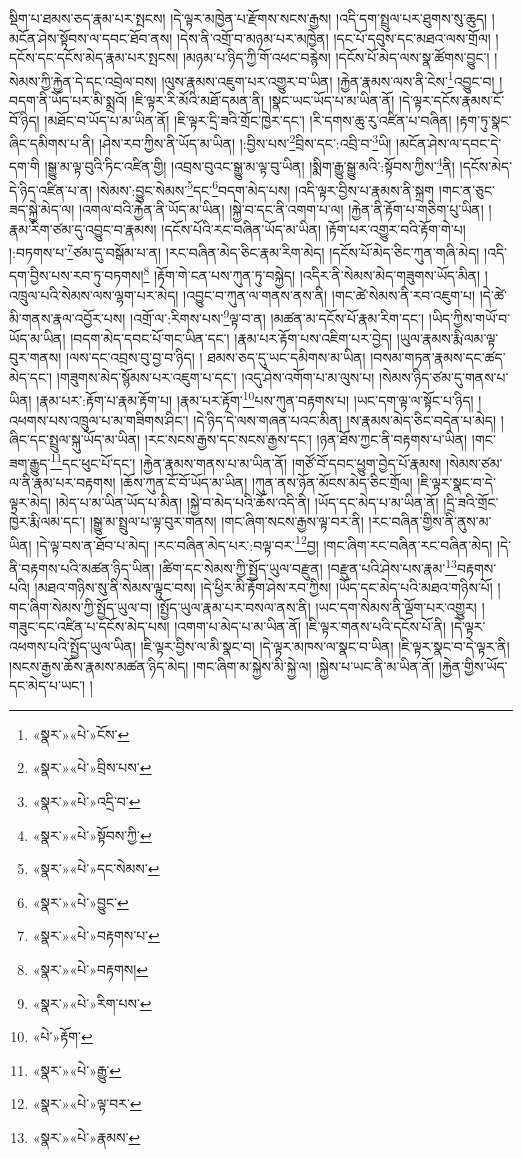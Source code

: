 སྡིག་པ་ཐམས་ཅད་རྣམ་པར་སྤངས། །དེ་ལྟར་མཁྱེན་པ་རྫོགས་སངས་རྒྱས། །འདི་དག་སྤྲུལ་པར་ཐུགས་སུ་ཆུད། །མངོན་ཤེས་སྟོབས་ལ་དབང་ཐོབ་ནས། །དེས་ནི་འགྲོ་བ་མཉམ་པར་མཁྱེན། །དང་པོ་དབུས་དང་མཐའ་ལས་གྲོལ། །དངོས་དང་དངོས་མེད་རྣམ་པར་སྤངས། །མཉམ་པ་ཉིད་ཀྱི་གོ་འཕང་བརྙེས། །དངོས་པོ་མེད་ལས་སྣ་ཚོགས་བྱུང་། །སེམས་ཀྱི་རྐྱེན་དེ་དང་འབྲེལ་བས། །ལུས་རྣམས་འཇུག་པར་འགྱུར་བ་ཡིན། །རྐྱེན་རྣམས་ལས་ནི་ངེས་\footnote{«སྣར་»«པེ་»ངོས་}འབྱུང་བ། །བདག་ནི་ཡོད་པར་མི་སྨྲའོ། །ཇི་ལྟར་རི་མོའི་མཐོ་དམན་ནི། །སྣང་ཡང་ཡོད་པ་མ་ཡིན་ནོ། །དེ་ལྟར་དངོས་རྣམས་ངོ་བོ་ཉིད། །མཐོང་བ་ཡོད་པ་མ་ཡིན་ནོ། །ཇི་ལྟར་དྲི་ཟའི་གྲོང་ཁྱེར་དང་། །རི་དགས་ཆུ་རུ་འཛིན་པ་བཞིན། །རྟག་ཏུ་སྣང་ཞིང་དམིགས་པ་ནི། །ཤེས་རབ་ཀྱིས་ནི་ཡོད་མ་ཡིན། །:བྱིས་པས་\footnote{«སྣར་»«པེ་»བྲིས་པས་}བྲིས་དང་:འབྲི་བ་\footnote{«སྣར་»«པེ་»འདྲི་བ་}ཡི། །མངོན་ཤེས་ལ་དབང་དེ་དག་གི །སྒྱུ་མ་ལྟ་བུའི་ཏིང་འཛིན་གྱི། །འབྲས་བུའང་སྒྱུ་མ་ལྟ་བུ་ཡིན། །སྨིག་རྒྱུ་སྒྱུ་མའི་:སྟོབས་ཀྱིས་\footnote{«སྣར་»«པེ་»སྟོབས་ཀྱི་}ནི། །དངོས་མེད་དེ་ཉིད་འཛིན་པ་ན། །སེམས་:བྱུང་སེམས་\footnote{«སྣར་»«པེ་»དང་སེམས་}དང་\footnote{«སྣར་»«པེ་»བྱུང་}བདག་མེད་པས། །འདི་ལྟར་བྱིས་པ་རྣམས་ནི་སྐྲག །གང་ན་ཅུང་ཟད་སྐྱེ་མེད་ལ། །འགལ་བའི་རྐྱེན་ནི་ཡོད་མ་ཡིན། །སྐྱེ་བ་དང་ནི་འགག་པ་ལ། །རྐྱེན་ནི་རྟོག་པ་གཅིག་པུ་ཡིན། །རྣམ་རིག་ཙམ་དུ་འབྱུང་བ་རྣམས། །དངོས་པོའི་རང་བཞིན་ཡོད་མ་ཡིན། །རྟོག་པར་འགྱུར་བའི་རྟོག་གེ་པ། །:བཏགས་པ་\footnote{«སྣར་»«པེ་»བརྟགས་པ་}ཙམ་དུ་བསྒོམ་པ་ན། །རང་བཞིན་མེད་ཅིང་རྣམ་རིག་མེད། །དངོས་པོ་མེད་ཅིང་ཀུན་གཞི་མེད། །འདི་དག་བྱིས་པས་རབ་ཏུ་བཏགས།\footnote{«སྣར་»«པེ་»བརྟགས།} །རྟོག་གེ་ངན་པས་ཀུན་ཏུ་བསྐྱེད། །འདིར་ནི་སེམས་མེད་གཟུགས་ཡོད་མིན། །འཁྲུལ་པའི་སེམས་ལས་ལྷག་པར་མེད། །འབྱུང་བ་ཀུན་ལ་གནས་ནས་ནི། །གང་ཚེ་སེམས་ནི་རབ་འཇུག་པ། །དེ་ཚེ་མི་གནས་རྣལ་འབྱོར་པས། །འགྲོ་ལ་:རིགས་པས་\footnote{«སྣར་»«པེ་»རིག་པས་}ལྟ་བ་ན། །མཚན་མ་དངོས་པོ་རྣམ་རིག་དང་། །ཡིད་ཀྱིས་གཡོ་བ་ཡོད་མ་ཡིན། །བདག་མེད་དབང་པོ་གང་ཡིན་དང་། །རྣམ་པར་རྟོག་པས་འཇིག་པར་བྱེད། །ཡུལ་རྣམས་རྨི་ལམ་ལྟ་བུར་གནས། །ལས་དང་འབྲས་བུ་བྱ་བ་ཉིད། །
ཐམས་ཅད་དུ་ཡང་དམིགས་མ་ཡིན། །བསམ་གཏན་རྣམས་དང་ཚད་མེད་དང་། །གཟུགས་མེད་སྙོམས་པར་འཇུག་པ་དང་། །འདུ་ཤེས་འགོག་པ་མ་ལུས་པ། །སེམས་ཉིད་ཙམ་དུ་གནས་པ་ཡིན། །རྣམ་པར་:རྟོག་པ་རྣམ་རྟོག་པ། །རྣམ་པར་རྟོག་\footnote{«པེ་»རྟོག་}པས་ཀུན་བརྟགས་པ། །ཡང་དག་ལྟ་ལ་སྟོང་པ་ཉིད། །འཕགས་པས་འཁྲུལ་པ་མ་གཟིགས་ཤིང་། །དེ་ཉིད་དེ་ལས་གཞན་པའང་མིན། །ས་རྣམས་མེད་ཅིང་བདེན་པ་མེད། །ཞིང་དང་སྤྲུལ་སྐུ་ཡོད་མ་ཡིན། །རང་སངས་རྒྱས་དང་སངས་རྒྱས་དང་། །ཉན་ཐོས་ཀྱང་ནི་བརྟགས་པ་ཡིན། །གང་ཟག་རྒྱུད་\footnote{«སྣར་»«པེ་»རྒྱུ་}དང་ཕུང་པོ་དང་། །རྐྱེན་རྣམས་གནས་པ་མ་ཡིན་ནོ། །གཙོ་བོ་དབང་ཕྱུག་བྱེད་པོ་རྣམས། །སེམས་ཙམ་ལ་ནི་རྣམ་པར་བརྟགས། །ཆོས་ཀུན་ངོ་བོ་ཡོད་མ་ཡིན། །ཀུན་ནས་ཉོན་མོངས་མེད་ཅིང་གྲོལ། །ཇི་ལྟར་སྣང་བ་དེ་ལྟར་མེད། །མེད་པ་མ་ཡིན་ཡོད་པ་མིན། །སྐྱེ་བ་མེད་པའི་ཆོས་འདི་ནི། །ཡོད་དང་མེད་པ་མ་ཡིན་ནོ། །དྲི་ཟའི་གྲོང་ཁྱེར་རྨི་ལམ་དང་། །སྒྱུ་མ་སྤྲུལ་པ་ལྟ་བུར་གནས། །གང་ཞིག་སངས་རྒྱས་ལྟ་བར་ནི། །རང་བཞིན་གྱིས་ནི་ནུས་མ་ཡིན། །དེ་ལྟ་བས་ན་ཐོབ་པ་མེད། །རང་བཞིན་མེད་པར་:བལྟ་བར་\footnote{«སྣར་»«པེ་»ལྟ་བར་}བྱ། །གང་ཞིག་རང་བཞིན་རང་བཞིན་མེད། །དེ་ནི་བརྟགས་པའི་མཚན་ཉིད་ཡིན། །ཚིག་དང་སེམས་ཀྱི་སྤྱོད་ཡུལ་བརྫུན། །བརྫུན་པའི་ཤེས་པས་རྣམ་\footnote{«སྣར་»«པེ་»རྣམས་}བརྟགས་པའི། །མཐའ་གཉིས་སུ་ནི་སེམས་ལྟུང་བས། །དེ་ཕྱིར་མི་རྟོག་ཤེས་རབ་ཀྱིས། །ཡོད་དང་མེད་པའི་མཐའ་གཉིས་པོ། །གང་ཞིག་སེམས་ཀྱི་སྤྱོད་ཡུལ་བ། །སྤྱོད་ཡུལ་རྣམ་པར་བསལ་ནས་ནི། །ཡང་དག་སེམས་ནི་ལྡོག་པར་འགྱུར། །གཟུང་དང་འཛིན་པ་དངོས་མེད་པས། །འགག་པ་མེད་པ་མ་ཡིན་ནོ། །ཇི་ལྟར་གནས་པའི་དངོས་པོ་ནི། །དེ་ལྟར་འཕགས་པའི་སྤྱོད་ཡུལ་ཡིན། །ཇི་ལྟར་བྱིས་ལ་མི་སྣང་བ། །དེ་ལྟར་མཁས་ལ་སྣང་བ་ཡིན། །ཇི་ལྟར་སྣང་བ་དེ་ལྟར་ནི། །སངས་རྒྱས་ཆོས་རྣམས་མཚན་ཉིད་མེད། །གང་ཞིག་མ་སྐྱེས་མི་སྐྱེ་ལ། །སྐྱེས་པ་ཡང་ནི་མ་ཡིན་ནོ། །རྐྱེན་གྱིས་ཡོད་དང་མེད་པ་ཡང་། །
